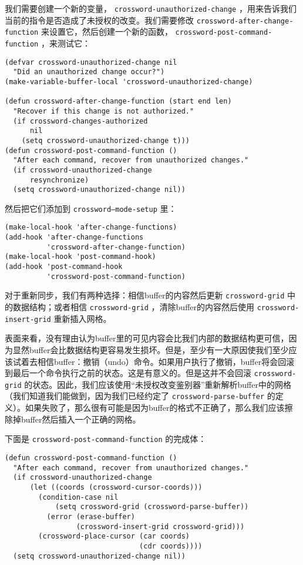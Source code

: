 我们需要创建一个新的变量， \texttt{crossword-unauthorized-change} ，用来告诉我们当前的指令是否造成了未授权的改变。我们需要修改 \texttt{crossword-after-change-function} 来设置它，然后创建一个新的函数， \texttt{crossword-post-command-function} ，来测试它：

\begin{verbatim}
(defvar crossword-unauthorized-change nil
  "Did an unauthorized change occur?")
(make-variable-buffer-local 'crossword-unauthorized-change)

(defun crossword-after-change-function (start end len)
  "Recover if this change is not authorized."
  (if crossword-changes-authorized
      nil
    (setq crossword-unauthorized-change t)))
(defun crossword-post-command-function ()
  "After each command, recover from unauthorized changes."
  (if crossword-unauthorized-change
      resynchronize)
  (setq crossword-unauthorized-change nil))
\end{verbatim}

然后把它们添加到 \texttt{crossword--mode-setup} 里：

\begin{verbatim}
(make-local-hook 'after-change-functions)
(add-hook 'after-change-functions
          'crossword-after-change-function)
(make-local-hook 'post-command-hook)
(add-hook 'post-command-hook
          'crossword-post-command-function)
\end{verbatim}

对于重新同步，我们有两种选择：相信buffer的内容然后更新 \texttt{crossword-grid} 中的数据结构；或者相信 \texttt{crossword-grid} ，清除buffer的内容然后使用 \texttt{crossword-insert-grid} 重新插入网格。

表面来看，没有理由认为buffer里的可见内容会比我们内部的数据结构更可信，因为显然buffer会比数据结构更容易发生损坏。但是，至少有一大原因使我们至少应该试着去相信buffer：撤销（undo）命令。如果用户执行了撤销，buffer将会回滚到最后一个命令执行之前的状态。这是有意义的。但是这并不会回滚 \texttt{crossword-grid} 的状态。因此，我们应该使用“未授权改变鉴别器”重新解析buffer中的网格（我们知道我们能做到，因为我们已经约定了 \texttt{crossword-parse-buffer} 的定义）。如果失败了，那么很有可能是因为buffer的格式不正确了，那么我们应该擦除掉buffer然后插入一个正确的网格。

下面是 \texttt{crossword-post-command-function} 的完成体：

\begin{verbatim}
(defun crossword-post-command-function ()
  "After each command, recover from unauthorized changes."
  (if crossword-unauthorized-change
      (let ((coords (crossword-cursor-coords)))
        (condition-case nil
            (setq crossword-grid (crossword-parse-buffer))
          (error (erase-buffer)
                 (crossword-insert-grid crossword-grid)))
        (crossword-place-cursor (car coords)
                                (cdr coords))))
  (setq crossword-unauthorized-change nil))
\end{verbatim}

